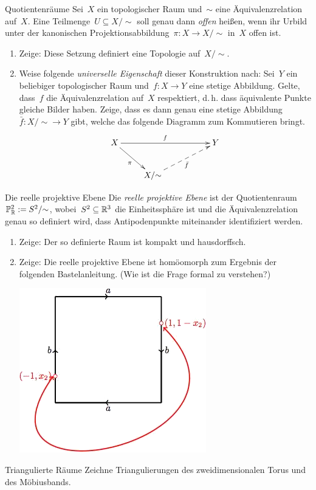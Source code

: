 \documentclass{uebblatt}
\begin{document}

\begin{aufgabe}{Quotientenräume}
Sei~$X$ ein topologischer Raum und~$\sim$ eine Äquivalenzrelation auf~$X$. Eine
Teilmenge~$U \subseteq X/{\sim}$ soll genau dann \emph{offen} heißen, wenn ihr Urbild
unter der kanonischen Projektionsabbildung~$\pi : X \to X/{\sim}$ in~$X$ offen ist.
\begin{enumerate}
\item Zeige: Diese Setzung definiert eine Topologie auf~$X/{\sim}$.
\item Weise folgende \emph{universelle Eigenschaft} dieser Konstruktion nach:
Sei~$Y$ ein beliebiger topologischer Raum und~$f : X \to Y$ eine stetige
Abbildung. Gelte, dass~$f$ die Äquivalenzrelation auf~$X$ respektiert, d.\,h.
dass äquivalente Punkte gleiche Bilder haben. Zeige, dass es dann genau eine
stetige Abbildung~$\bar f : X/{\sim} \to Y$ gibt, welche das folgende Diagramm
zum Kommutieren bringt.
\[ \xymatrix{
  X \ar[rd]_{\pi} \ar[rrr]^f &&& Y \\
  & X/{\sim} \ar@{-->}[rru]_{\bar f}
} \]
\end{enumerate}
\end{aufgabe}

\begin{aufgabe}{Die reelle projektive Ebene}
Die \emph{reelle projektive Ebene} ist der Quotientenraum~$\mathbb{P}^2_{\mathbb{R}} :=
S^2/{\sim}$, wobei~$S^2 \subseteq \mathbb{R}^3$ die Einheitssphäre ist und die
Äquivalenzrelation genau so definiert wird, dass Antipodenpunkte miteinander
identifiziert werden.
\begin{enumerate}
\item Zeige: Der so definierte Raum ist kompakt und hausdorffsch.
\item Zeige: Die reelle projektive Ebene ist homöomorph zum Ergebnis der
folgenden Bastelanleitung. (Wie ist die Frage formal zu verstehen?)
\begin{center}
  \vspace{0.5em}
  \includegraphics[scale=0.5]{reelle-projektive-ebene}
\end{center}
\end{enumerate}
\end{aufgabe}

\begin{aufgabe}{Triangulierte Räume}
Zeichne Triangulierungen des zweidimensionalen Torus und des Möbiusbands.
\end{aufgabe}
\end{document}

